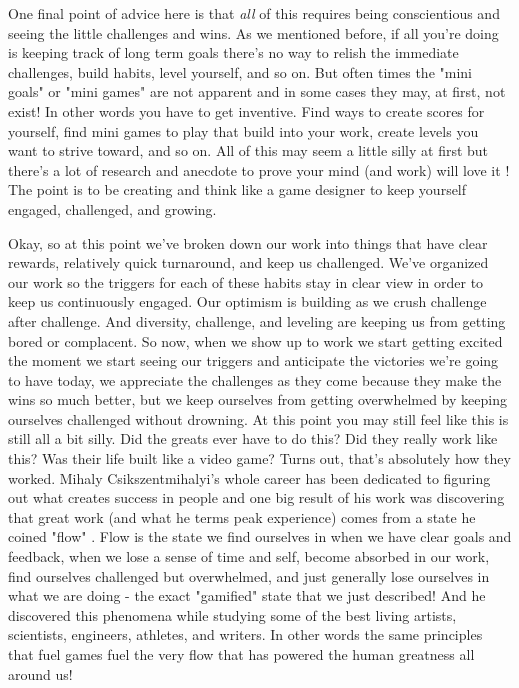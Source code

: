 \documentclass[11pt]{book}
\begin{document}
One final point of advice here is that \textit{all} of this requires being conscientious and seeing the little challenges and wins. As we mentioned before, if all you're doing is keeping track of long term goals there's no way to relish the immediate challenges, build habits, level yourself, and so on. But often times the "mini goals" or "mini games" are not apparent and in some cases they may, at first, not exist! In other words you have to get inventive. Find ways to create scores for yourself, find mini games to play that build into your work, create levels you want to strive toward, and so on. All of this may seem a little silly at first but there's a lot of research and anecdote to prove your mind (and work) will love it \cite{superbetter}! The point is to be creating and think like a game designer to keep yourself engaged, challenged, and growing. 
\newline

Okay, so at this point we've broken down our work into things that have clear rewards, relatively quick turnaround, and keep us challenged. We've organized our work so the triggers for each of these habits stay in clear view in order to keep us continuously engaged. Our optimism is building as we crush challenge after challenge. And diversity, challenge, and leveling are keeping us from getting bored or complacent. So now, when we show up to work we start getting excited the moment we start seeing our triggers and anticipate the victories we're going to have today, we appreciate the challenges as they come because they make the wins so much better, but we keep ourselves from getting overwhelmed by keeping ourselves challenged without drowning. At this point you may still feel like this is still all a bit silly. Did the greats ever have to do this? Did they really work like this? Was their life built like a video game? Turns out, that's absolutely how they worked. Mihaly Csikszentmihalyi's whole career has been dedicated to figuring out what creates success in people and one big result of his work was discovering that great work (and what he terms peak experience) comes from a state he coined "flow" \cite{flow}. Flow is the state we find ourselves in when we have clear goals and feedback, when we lose a sense of time and self, become absorbed in our work, find ourselves challenged but overwhelmed, and just generally lose ourselves in what we are doing - the exact "gamified" state that we just described! And he discovered this phenomena while studying some of the best living artists, scientists, engineers, athletes, and writers. In other words the same principles that fuel games fuel the very flow that has powered the human greatness all around us!
\newline
\end{document}
